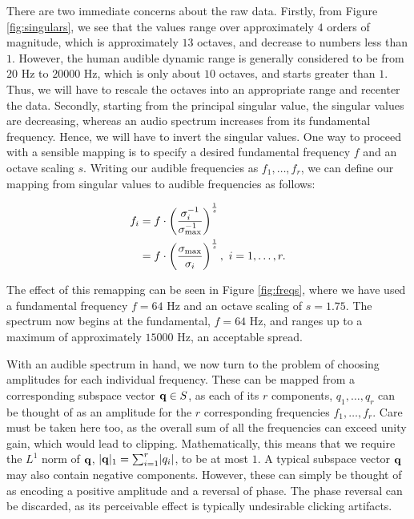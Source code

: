 \documentclass[11pt]{article}
\begin{document}
There are two immediate concerns about the raw data. Firstly, from Figure \ref{fig:singulars}, we see that the values range over approximately $4$ orders of magnitude, which is approximately $13$ octaves, and decrease to numbers less than $1$. However, the human audible dynamic range is generally considered to be from $20$ Hz to $20000$ Hz, which is only about $10$ octaves, and starts greater than $1$. Thus, we will have to rescale the octaves into an appropriate range and recenter the data. Secondly, starting from the principal singular value, the singular values are decreasing, whereas an audio spectrum increases from its fundamental frequency. Hence, we will have to invert the singular values. One way to proceed with a sensible mapping is to specify a desired fundamental frequency $f$ and an octave scaling $s$. Writing our audible frequencies as $f_1, \ldots, f_r$, we can define our mapping from singular values to audible frequencies as follows:

\begin{equation} 
\begin{aligned}
f_i &= f \cdot \left(\frac{\sigma_{i}^{-1}}{\sigma_{\textnormal{max}}^{-1}}\right)^{\frac{1}{s}} \\
&= f \cdot \left(\frac{\sigma_{\textnormal{max}}}{\sigma_i}\right)^{\frac{1}{s}}, \ i = 1, \ldots, r.
\end{aligned}
\end{equation}

The effect of this remapping can be seen in Figure \ref{fig:freqs}, where we have used a fundamental frequency $f = 64$ Hz and an octave scaling of $s = 1.75$. The spectrum now begins at the fundamental, $f = 64$ Hz, and ranges up to a maximum of approximately $15000$ Hz, an acceptable spread.

With an audible spectrum in hand, we now turn to the problem of choosing amplitudes for each individual frequency. These can be mapped from a corresponding subspace vector $\mathbf{q} \in S$, as each of its $r$ components, $q_1, \ldots, q_r$ can be thought of as an amplitude for the $r$ corresponding frequencies $f_1, \ldots, f_r$. Care must be taken here too, as the overall sum of all the frequencies can exceed unity gain, which would lead to clipping. Mathematically, this means that we require the $L^1$ norm of $\mathbf{q}$, $\lvert\mathbf{q}\rvert_1 = \sum_{i=1}^{r}\lvert q_i \rvert$, to be at most $1$. A typical subspace vector $\mathbf{q}$ may also contain negative components. However, these can simply be thought of as encoding a positive amplitude and a reversal of phase. The phase reversal can be discarded, as its perceivable effect is typically undesirable clicking artifacts.
\end{document}
